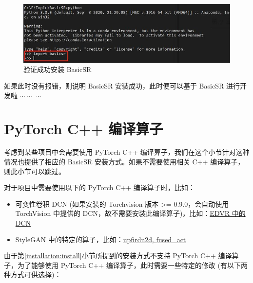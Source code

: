 \documentclass[../main.tex]{subfiles}
\begin{document}
\begin{figure}[H]
\begin{center}
    \includegraphics[width=0.9\linewidth]{figures/installation_correct_install.jpg}
    \caption{验证成功安装 BasicSR}
    \label{fig:correct-install}
\end{center}
\vspace{-0.5cm}
\end{figure}

如果此时没有报错，则说明 BasicSR 安装成功，此时便可以基于 BasicSR 进行开发啦 $\sim \sim \sim$

\section{PyTorch C++ 编译算子}
\label{installation:c++}

考虑到某些项目中会需要使用 PyTorch C++ 编译算子，我们在这个小节针对这种情况也提供了相应的 BasicSR 安装方式。如果不需要使用相关 C++ 编译算子，则此小节可以跳过。

对于项目中需要使用以下的 PyTorch C++ 编译算子时，比如：

\begin{itemize}
    \item 可变性卷积 DCN (如果安装的 Torchvision 版本 >= 0.9.0，会自动使用 TorchVision 中提供的 DCN，故不需要安装此编译算子)，比如：\href{https://github.com/XPixelGroup/BasicSR/tree/master/basicsr/ops}{EDVR 中的 DCN}

    \item StyleGAN 中的特定的算子，比如：\href{https://github.com/XPixelGroup/BasicSR/tree/master/basicsr/ops}{upfirdn2d, fused\_act}
\end{itemize}

由于第\ref{installation:install}小节所提到的安装方式不支持 PyTorch C++ 编译算子，为了能够使用 PyTorch C++ 编译算子，此时需要一些特定的修改 (有以下两种方式可供选择)：
\end{document}

